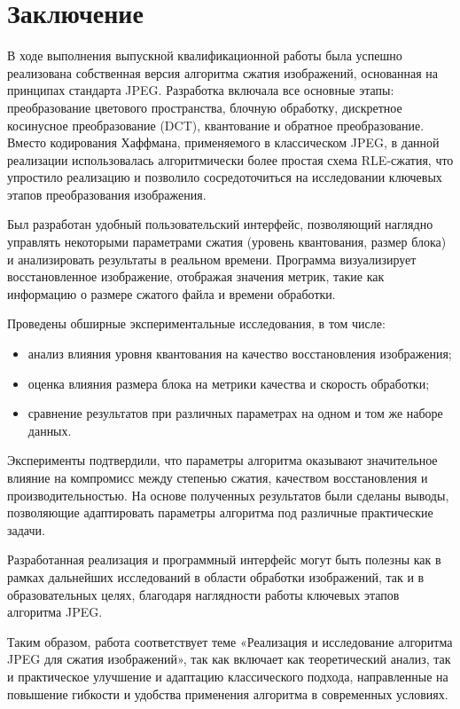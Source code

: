 \section{Заключение}

В ходе выполнения выпускной квалификационной работы была успешно реализована собственная версия алгоритма 
сжатия изображений, основанная на принципах стандарта JPEG. 
Разработка включала все основные этапы: преобразование цветового пространства, 
блочную обработку, дискретное косинусное преобразование (DCT), квантование и обратное преобразование. 
Вместо кодирования Хаффмана, применяемого в классическом JPEG, 
в данной реализации использовалась алгоритмически более простая схема RLE-сжатия, 
что упростило реализацию и позволило сосредоточиться на исследовании ключевых этапов преобразования изображения.

Был разработан удобный пользовательский интерфейс, позволяющий наглядно управлять некоторыми параметрами 
сжатия (уровень квантования, размер блока) и анализировать результаты в реальном времени. 
Программа визуализирует восстановленное изображение, отображая значения метрик, 
такие как информацию о размере сжатого файла и времени обработки.

Проведены обширные экспериментальные исследования, в том числе:

\begin{itemize}
    \item анализ влияния уровня квантования на качество восстановления изображения;
    \item оценка влияния размера блока на метрики качества и скорость обработки;
    \item сравнение результатов при различных параметрах на одном и том же наборе данных.
\end{itemize}

Эксперименты подтвердили, что параметры алгоритма оказывают значительное влияние 
на компромисс между степенью сжатия, качеством восстановления и производительностью. 
На основе полученных результатов были сделаны выводы, позволяющие адаптировать параметры алгоритма 
под различные практические задачи.

Разработанная реализация и программный интерфейс могут быть полезны как в рамках дальнейших исследований 
в области обработки изображений, так и в образовательных целях, 
благодаря наглядности работы ключевых этапов алгоритма JPEG.

Таким образом, работа соответствует теме «Реализация и исследование алгоритма JPEG для сжатия изображений», 
так как включает как теоретический анализ, так и практическое улучшение и адаптацию классического подхода, 
направленные на повышение гибкости и удобства применения алгоритма в современных условиях.